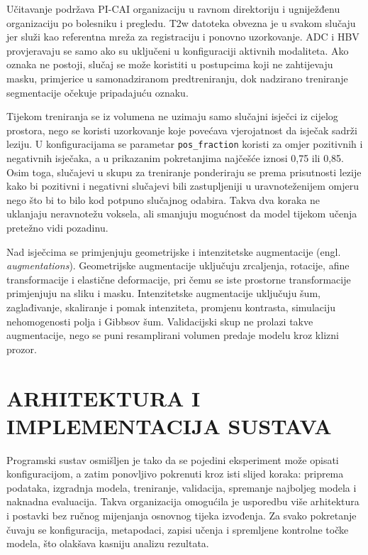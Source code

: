 \documentclass[a4paper,12pt,oneside]{article}
\let\sectionwithoutpagebreak\section
\renewcommand{\section}{\clearpage\sectionwithoutpagebreak}%
\begin{document}

Učitavanje podržava PI-CAI organizaciju u ravnom direktoriju i ugniježđenu organizaciju po bolesniku i pregledu. T2w datoteka obvezna je u svakom slučaju jer služi kao referentna mreža za registraciju i ponovno uzorkovanje. ADC i HBV provjeravaju se samo ako su uključeni u konfiguraciji aktivnih modaliteta. Ako oznaka ne postoji, slučaj se može koristiti u postupcima koji ne zahtijevaju masku, primjerice u samonadziranom predtreniranju, dok nadzirano treniranje segmentacije očekuje pripadajuću oznaku.

Tijekom treniranja se iz volumena ne uzimaju samo slučajni isječci iz cijelog prostora, nego se koristi uzorkovanje koje povećava vjerojatnost da isječak sadrži leziju. U konfiguracijama se parametar \texttt{pos\_fraction} koristi za omjer pozitivnih i negativnih isječaka, a u prikazanim pokretanjima najčešće iznosi 0,75 ili 0,85. Osim toga, slučajevi u skupu za treniranje ponderiraju se prema prisutnosti lezije kako bi pozitivni i negativni slučajevi bili zastupljeniji u uravnoteženijem omjeru nego što bi to bilo kod potpuno slučajnog odabira. Takva dva koraka ne uklanjaju neravnotežu voksela, ali smanjuju mogućnost da model tijekom učenja pretežno vidi pozadinu.

Nad isječcima se primjenjuju geometrijske i intenzitetske augmentacije (engl. \textit{augmentations}). Geometrijske augmentacije uključuju zrcaljenja, rotacije, afine transformacije i elastične deformacije, pri čemu se iste prostorne transformacije primjenjuju na sliku i masku. Intenzitetske augmentacije uključuju šum, zaglađivanje, skaliranje i pomak intenziteta, promjenu kontrasta, simulaciju nehomogenosti polja i Gibbsov šum. Validacijski skup ne prolazi takve augmentacije, nego se puni resamplirani volumen predaje modelu kroz klizni prozor.

\section{ARHITEKTURA I IMPLEMENTACIJA SUSTAVA}

Programski sustav osmišljen je tako da se pojedini eksperiment može opisati konfiguracijom, a zatim ponovljivo pokrenuti kroz isti slijed koraka: priprema podataka, izgradnja modela, treniranje, validacija, spremanje najboljeg modela i naknadna evaluacija. Takva organizacija omogućila je usporedbu više arhitektura i postavki bez ručnog mijenjanja osnovnog tijeka izvođenja. Za svako pokretanje čuvaju se konfiguracija, metapodaci, zapisi učenja i spremljene kontrolne točke modela, što olakšava kasniju analizu rezultata.
\end{document}
